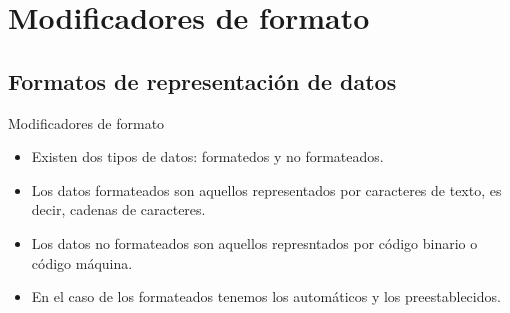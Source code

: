 
\section{Modificadores de formato}  


\subsection{Formatos de representación de datos}

\begin{frame}[fragile]{Modificadores de formato} 
    \begin{itemize}[<+(1)->]
        \item Existen dos tipos de datos: formatedos y no formateados.
        \item Los datos formateados son aquellos representados por caracteres de texto, es decir, cadenas de caracteres.
        \item Los datos no formateados son aquellos represntados por código binario o código máquina.
        \item En el caso de los formateados tenemos los automáticos y los preestablecidos.
    \end{itemize}
\end{frame}

